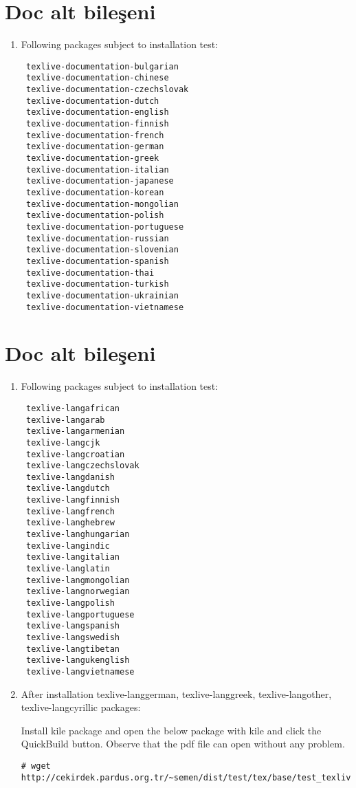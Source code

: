\documentclass[a4paper,10pt]{article}
\begin{document}
\section{Doc alt bileşeni} 
\begin{enumerate}
\item  Following packages subject to installation test:

\begin{verbatim}
 texlive-documentation-bulgarian
 texlive-documentation-chinese
 texlive-documentation-czechslovak
 texlive-documentation-dutch
 texlive-documentation-english
 texlive-documentation-finnish
 texlive-documentation-french
 texlive-documentation-german
 texlive-documentation-greek
 texlive-documentation-italian
 texlive-documentation-japanese
 texlive-documentation-korean
 texlive-documentation-mongolian
 texlive-documentation-polish
 texlive-documentation-portuguese
 texlive-documentation-russian
 texlive-documentation-slovenian
 texlive-documentation-spanish
 texlive-documentation-thai
 texlive-documentation-turkish
 texlive-documentation-ukrainian
 texlive-documentation-vietnamese
\end{verbatim}

\end{enumerate}

\section{Doc alt bileşeni} 
\begin{enumerate}
 \item Following packages subject to installation test:
\begin{verbatim}
 texlive-langafrican
 texlive-langarab
 texlive-langarmenian
 texlive-langcjk
 texlive-langcroatian
 texlive-langczechslovak
 texlive-langdanish
 texlive-langdutch
 texlive-langfinnish
 texlive-langfrench
 texlive-langhebrew
 texlive-langhungarian
 texlive-langindic
 texlive-langitalian
 texlive-langlatin
 texlive-langmongolian
 texlive-langnorwegian
 texlive-langpolish
 texlive-langportuguese
 texlive-langspanish
 texlive-langswedish
 texlive-langtibetan
 texlive-langukenglish
 texlive-langvietnamese
\end{verbatim}
\item  After installation texlive-langgerman, texlive-langgreek, texlive-langother, texlive-langcyrillic  packages:

Install kile package and open the below package with kile and click the QuickBuild button. Observe that the pdf file can open without any problem.

\begin{verbatim}
# wget http://cekirdek.pardus.org.tr/~semen/dist/test/tex/base/test_texlivelatex.tex
\end{verbatim}

\end{enumerate}
\end{document}
